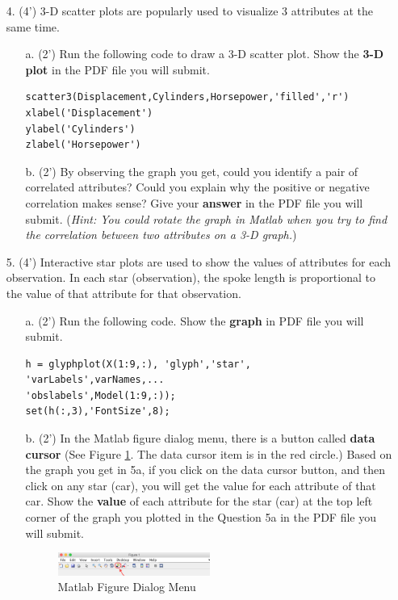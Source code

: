 \begin{enumerate}
\item[4.] (4') 3-D scatter plots are popularly used to visualize 3 attributes at the same time. 
\begin{itemize}
\item[a.] (2') Run the following code to draw a 3-D scatter plot. Show the \textbf{3-D plot} in the PDF file you will submit. 
\begin{lstlisting}
scatter3(Displacement,Cylinders,Horsepower,'filled','r')
xlabel('Displacement')
ylabel('Cylinders')
zlabel('Horsepower')
\end{lstlisting}
\item[b.] (2') By observing the graph you get, could you identify a pair of correlated attributes? Could you explain why the positive or negative correlation makes sense? Give your \textbf{answer} in the PDF file you will submit. (\textit{Hint: You could rotate the graph in Matlab when you try to find the correlation between two attributes on a 3-D graph.})
\end{itemize}

\item[5.] (4') Interactive star plots are used to show the values of attributes for each observation. In each star (observation), the spoke length is proportional to the value of that attribute for that observation.
\begin{itemize}
\item[a.] (2') Run the following code. Show the \textbf{graph} in PDF file you will submit.
\begin{lstlisting}
h = glyphplot(X(1:9,:), 'glyph','star', 'varLabels',varNames,...
'obslabels',Model(1:9,:));
set(h(:,3),'FontSize',8);
\end{lstlisting}
\item[b.] (2') In the Matlab figure dialog menu, there is a button called \textbf{data cursor} (See Figure \ref{fig:datacuror}. The data cursor item is in the red circle.) Based on the graph you get in 5a, if you click on the data cursor button, and then click on any star (car), you will get the value for each attribute of that car. Show the \textbf{value} of each attribute for the star (car) at the top left corner of the graph you plotted in the Question 5a in the PDF file you will submit.
\begin{figure}[!h]
\includegraphics[width=0.5\textwidth]{pics/datacursor.png}
\centering
\caption{Matlab Figure Dialog Menu}
\label{fig:datacuror}
\end{figure}
\end{itemize}

\end{enumerate}